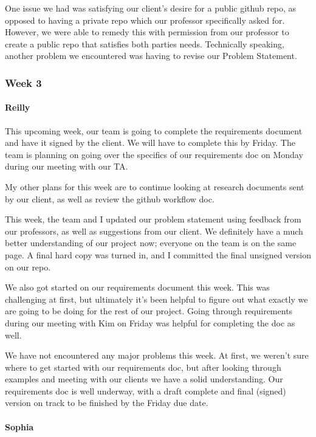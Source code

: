 \documentclass[onecolumn, draftclsnofoot,10pt, compsoc]{IEEEtran}
\begin{document}
\begin{flushleft}
 
One issue we had was satisfying our client's desire for a public github repo, as opposed to having a private repo which our professor specifically asked for. However, we were able to remedy this with permission from our professor to create a public repo that satisfies both parties needs. Technically speaking, another problem we encountered was having to revise our Problem Statement.
 
\subsubsection{Week 3}
\paragraph{Reilly}
 
This upcoming week, our team is going to complete the requirements document and have it signed by the client. We will have to complete this by Friday. The team is planning on going over the specifics of our requirements doc on Monday during our meeting with our TA.
 
My other plans for this week are to continue looking at research documents sent by our client, as well as review the github workflow doc.
 
 
This week, the team and I updated our problem statement using feedback from our professors, as well as suggestions from our client. We definitely have a much better understanding of our project now; everyone on the team is on the same page. A final hard copy was turned in, and I committed the final unsigned version on our repo.
 
We also got started on our requirements document this week. This was challenging at first, but ultimately it's been helpful to figure out what exactly we are going to be doing for the rest of our project. Going through requirements during our meeting with Kim on Friday was helpful for completing the doc as well.
 
 
We have not encountered any major problems this week. At first, we weren't sure where to get started with our requirements doc, but after looking through examples and meeting with our clients we have a solid understanding. Our requirements doc is well underway, with a draft complete and final (signed) version on track to be finished by the Friday due date.
 
\paragraph{Sophia}
 

\end{flushleft}
\end{document}
